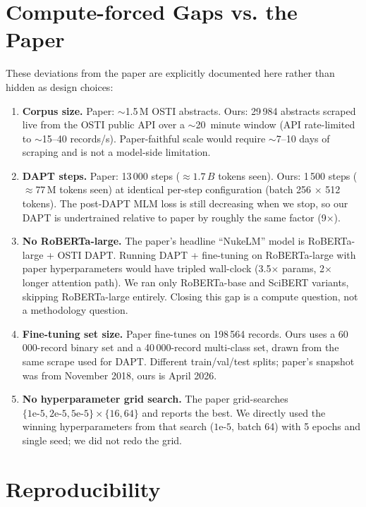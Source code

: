 \documentclass[11pt]{article}
\begin{document}
\section{Compute-forced Gaps vs. the Paper}
\label{sec:gaps}

These deviations from the paper are explicitly documented here rather than hidden as design choices:
\begin{enumerate}
  \item \textbf{Corpus size.} Paper: $\sim$1.5\,M OSTI abstracts. Ours: 29\,984 abstracts scraped live from the OSTI public API over a $\sim$20~minute window (API rate-limited to $\sim$15--40 records/s). Paper-faithful scale would require $\sim$7--10 days of scraping and is not a model-side limitation.
  \item \textbf{DAPT steps.} Paper: 13\,000 steps ($\approx 1.7\,B$ tokens seen). Ours: 1\,500 steps ($\approx$77\,M tokens seen) at identical per-step configuration (batch 256 $\times$ 512 tokens). The post-DAPT MLM loss is still decreasing when we stop, so our DAPT is undertrained relative to paper by roughly the same factor (9$\times$).
  \item \textbf{No RoBERTa-large.} The paper's headline ``NukeLM'' model is RoBERTa-large + OSTI DAPT. Running DAPT + fine-tuning on RoBERTa-large with paper hyperparameters would have tripled wall-clock (3.5$\times$ params, 2$\times$ longer attention path). We ran only RoBERTa-base and SciBERT variants, skipping RoBERTa-large entirely. Closing this gap is a compute question, not a methodology question.
  \item \textbf{Fine-tuning set size.} Paper fine-tunes on 198\,564 records. Ours uses a 60\,000-record binary set and a 40\,000-record multi-class set, drawn from the same scrape used for DAPT. Different train/val/test splits; paper's snapshot was from November 2018, ours is April 2026.
  \item \textbf{No hyperparameter grid search.} The paper grid-searches $\{1\text{e-}5, 2\text{e-}5, 5\text{e-}5\} \times \{16, 64\}$ and reports the best. We directly used the winning hyperparameters from that search ($1\text{e-}5$, batch 64) with 5 epochs and single seed; we did not redo the grid.
\end{enumerate}

\section{Reproducibility}
\end{document}
